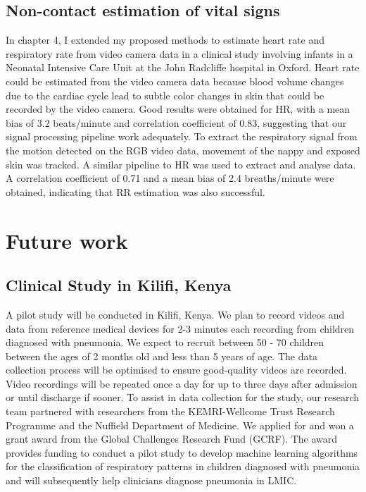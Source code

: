 \subsection{Non-contact estimation of vital signs}

In chapter 4, I extended my proposed methods to estimate heart rate and respiratory rate from video camera data in a clinical study involving infants in a Neonatal Intensive Care Unit at the John Radcliffe hospital in Oxford. Heart rate could be estimated from the video camera data because blood volume changes due to the cardiac cycle lead to subtle color changes in skin that could be recorded by the video camera. Good results were obtained for HR, with a mean bias of 3.2 beats/minute and correlation coefficient of 0.83, suggesting that our signal processing pipeline work adequately. To extract the respiratory signal from the motion detected on the RGB video data, movement of the nappy and exposed skin was tracked. A similar pipeline to HR was used to extract and analyse data. A correlation coefficient of 0.71 and a mean bias of 2.4 breaths/minute were obtained, indicating that RR estimation was also successful.

\section{Future work}
\subsection{Clinical Study in Kilifi, Kenya}

A pilot study will be conducted in Kilifi, Kenya. We plan to record videos and data from reference medical devices for 2-3 minutes each recording from children diagnosed with pneumonia. We expect to recruit between 50 - 70 children between the ages of 2 months old and less than 5 years of age. The data collection process will be optimised to ensure good-quality videos are recorded. Video recordings will be repeated once a day for up to three days after admission or until discharge if sooner. To assist in data collection for the study, our research team partnered with researchers from the KEMRI-Wellcome Trust Research Programme and the Nuffield Department of Medicine. We applied for and won a grant award from the Global Challenges Research Fund (GCRF). The award provides funding to conduct a pilot study to develop machine learning algorithms for the classification of respiratory patterns in children diagnosed with pneumonia and will subsequently help clinicians diagnose pneumonia in LMIC.

